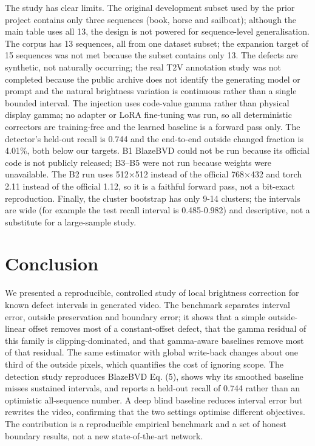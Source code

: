 \documentclass[twocolumn,10pt]{svjour3}
\begin{document}
The study has clear limits. The original development subset used by the prior project contains only three sequences (book, horse and sailboat); although the main table uses all 13, the design is not powered for sequence-level generalisation. The corpus has 13 sequences, all from one dataset subset; the expansion target of 15 sequences was not met because the subset contains only 13. The defects are synthetic, not naturally occurring; the real T2V annotation study was not completed because the public archive does not identify the generating model or prompt and the natural brightness variation is continuous rather than a single bounded interval. The injection uses code-value gamma rather than physical display gamma; no adapter or LoRA fine-tuning was run, so all deterministic correctors are training-free and the learned baseline is a forward pass only. The detector's held-out recall is 0.744 and the end-to-end outside changed fraction is 4.01\%, both below our targets. B1 BlazeBVD could not be run because its official code is not publicly released; B3–B5 were not run because weights were unavailable. The B2 run uses 512$\times$512 instead of the official 768$\times$432 and torch 2.11 instead of the official 1.12, so it is a faithful forward pass, not a bit-exact reproduction. Finally, the cluster bootstrap has only 9-14 clusters; the intervals are wide (for example the test recall interval is 0.485-0.982) and descriptive, not a substitute for a large-sample study.


\section{Conclusion}

We presented a reproducible, controlled study of local brightness correction for known defect intervals in generated video. The benchmark separates interval error, outside preservation and boundary error; it shows that a simple outside-linear offset removes most of a constant-offset defect, that the gamma residual of this family is clipping-dominated, and that gamma-aware baselines remove most of that residual. The same estimator with global write-back changes about one third of the outside pixels, which quantifies the cost of ignoring scope. The detection study reproduces BlazeBVD Eq. (5), shows why its smoothed baseline misses sustained intervals, and reports a held-out recall of 0.744 rather than an optimistic all-sequence number. A deep blind baseline reduces interval error but rewrites the video, confirming that the two settings optimise different objectives. The contribution is a reproducible empirical benchmark and a set of honest boundary results, not a new state-of-the-art network.
\end{document}
